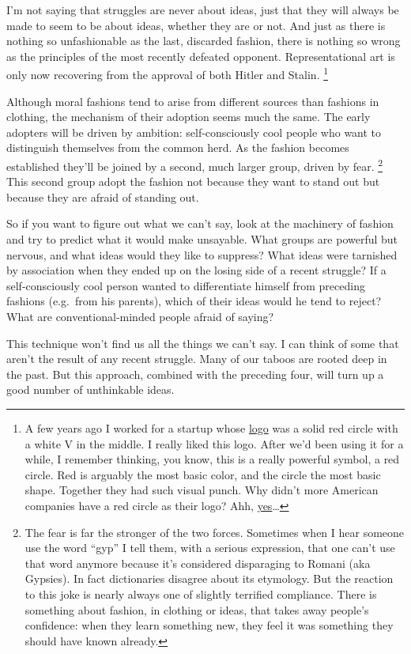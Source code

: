 I'm not saying that struggles are never about ideas, just that they will
always be made to seem to be about ideas, whether they are or not. And
just as there is nothing so unfashionable as the last, discarded
fashion, there is nothing so wrong as the principles of the most
recently defeated opponent. Representational art is only now recovering
from the approval of both Hitler and Stalin. \footnote{A few years ago I worked for a startup whose
\href{vwfront.html}{logo} was a solid red circle with a white V in the
middle. I really liked this logo. After we'd been using it for a while,
I remember thinking, you know, this is a really powerful symbol, a red
circle. Red is arguably the most basic color, and the circle the most
basic shape. Together they had such visual punch. Why didn't more
American companies have a red circle as their logo? Ahh,
\href{zero.html}{yes}\ldots{}}

Although moral fashions tend to arise from different sources than
fashions in clothing, the mechanism of their adoption seems much the
same. The early adopters will be driven by ambition: self-consciously
cool people who want to distinguish themselves from the common herd. As
the fashion becomes established they'll be joined by a second, much
larger group, driven by fear. \footnote{The fear is far the stronger of the two forces. Sometimes when I
hear someone use the word ``gyp'' I tell them, with a serious
expression, that one can't use that word anymore because it's considered
disparaging to Romani (aka Gypsies). In fact dictionaries disagree about
its etymology. But the reaction to this joke is nearly always one of
slightly terrified compliance. There is something about fashion, in
clothing or ideas, that takes away people's confidence: when they learn
something new, they feel it was something they should have known
already.} This second group adopt the
fashion not because they want to stand out but because they are afraid
of standing out.

So if you want to figure out what we can't say, look at the machinery of
fashion and try to predict what it would make unsayable. What groups are
powerful but nervous, and what ideas would they like to suppress? What
ideas were tarnished by association when they ended up on the losing
side of a recent struggle? If a self-consciously cool person wanted to
differentiate himself from preceding fashions (e.g.~from his parents),
which of their ideas would he tend to reject? What are
conventional-minded people afraid of saying?

This technique won't find us all the things we can't say. I can think of
some that aren't the result of any recent struggle. Many of our taboos
are rooted deep in the past. But this approach, combined with the
preceding four, will turn up a good number of unthinkable ideas.

